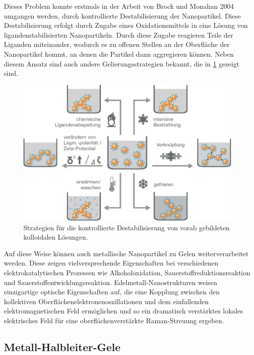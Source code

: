     Dieses Problem konnte erstmals in der Arbeit von Brock und Monahan 2004 umgangen werden, durch kontrollierte Destabilisierung der Nanopartikel. \autocite{Mohanan2004,Mohanan2005}
    Diese Destabilisierung erfolgt durch Zugabe eines Oxidationsmittels in eine Lösung von ligandenstabilisierten Nanopartikeln.
    Durch diese Zugabe reagieren Teile der Liganden miteinander, wodurch es zu offenen Stellen an der Oberfläche der Nanopartikel kommt, an denen die Partikel dann aggregieren können.
    Neben diesem Ansatz sind auch andere Gelierungsstrategien bekannt, die in \cref{fig:Destabilisierung} gezeigt sind.
    
    \begin{figure}[H]
        \centering
        \includegraphics[width=0.6\linewidth]{Bilder/Gelierung.png}
        \caption{Strategien für die kontrollierte Destabilisierung von vorab gebildeten kolloidalen Lösungen.\autocite{Aleman2007}}
        \label{fig:Destabilisierung}
    \end{figure}
    
    Auf diese Weise können auch metallische Nanopartikel zu Gelen weiterverarbeitet werden. \autocite{Bigall2009}
    Diese zeigen vielversprechende Eigenschaften bei verschiedenen elektrokatalytischen Prozessen wie Alkoholoxidation, Sauerstoffreduktionsreaktion und Sauerstoffentwicklungsreaktion. \autocite{Cai2018,Shi2018,Zhu2016,Shi2017,Wang2019}
    Edelmetall-Nanostrukturen weisen einzigartige optische Eigenschaften auf, die eine Kopplung zwischen den kollektiven Oberflächenelektronenoszillationen und dem einfallenden elektromagnetischen Feld ermöglichen und so ein dramatisch verstärktes lokales elektrisches Feld für eine oberflächenverstärkte Raman-Streuung ergeben. \autocite{Linic2015,Gao2016}

    
    \subsection{Metall-Halbleiter-Gele}
    \todo{}